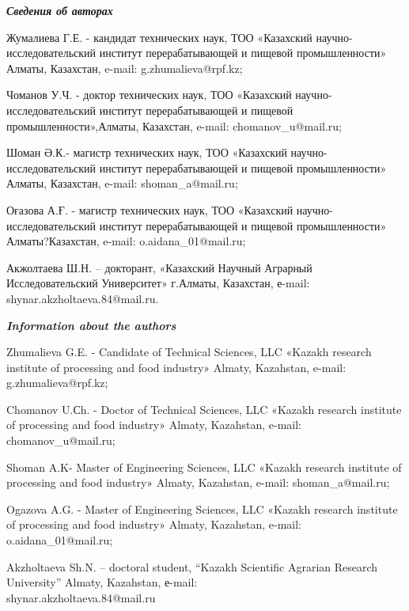 \begin{authorinfo}
\emph{{\bfseries Сведения об авторах}}

Жумалиева Г.Е. - кандидат технических наук, ТОО «Казахский
научно-исследовательский институт перерабатывающей и пищевой
промышленности» Алматы, Казахстан, e-mail: g.zhumalieva@rpf.kz;

Чоманов У.Ч. - доктор технических наук, ТОО «Казахский
научно-исследовательский институт перерабатывающей и пищевой
промышленности»,Алматы, Казахстан, e-mail: chomanov\_u@mail.ru;

Шоман Ә.К.- магистр технических наук, ТОО «Казахский
научно-исследовательский институт перерабатывающей и пищевой
промышленности» Алматы, Казахстан, e-mail: shoman\_a@mail.ru;

Оғазова А.Ғ. - магистр технических наук, ТОО «Казахский
научно-исследовательский институт перерабатывающей и пищевой
промышленности» Алматы?Казахстан, e-mail: o.aidana\_01@mail.ru;

Акжолтаева Ш.Н. – докторант, «Казахский Научный Аграрный
Исследовательский Университет» г.Алматы, Казахстан, е-mail:
shynar.akzholtaeva.84@mail.ru.

\emph{{\bfseries Information about the authors}}

Zhumalieva G.E. - Candidate of Technical Sciences, LLC «Kazakh research
institute of processing and food industry» Almaty, Kazahstan, e-mail:
g.zhumalieva@rpf.kz;

Chomanov U.Сh. - Doctor of Technical Sciences, LLC «Kazakh research
institute of processing and food industry» Almaty, Kazahstan, e-mail:
chomanov\_u@mail.ru;

Shoman A.K- Master of Engineering Sciences, LLC «Kazakh research
institute of processing and food industry» Almaty, Kazahstan, e-mail:
shoman\_a@mail.ru;

Ogazova A.G. - Master of Engineering Sciences, LLC «Kazakh research
institute of processing and food industry» Almaty, Kazahstan, e-mail:
o.aidana\_01@mail.ru;

Akzholtaeva Sh.N. – doctoral student, “Kazakh Scientific Agrarian
Research University” Almaty, Kazahstan, е-mail:\\
shynar.akzholtaeva.84@mail.ru
\end{authorinfo}
